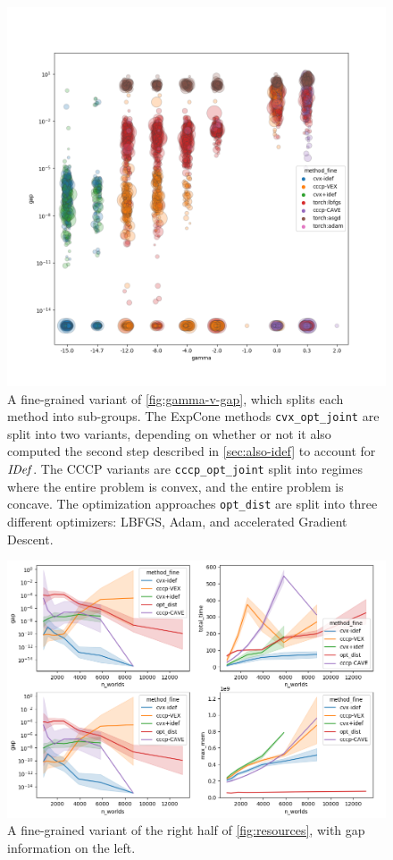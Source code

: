 \documentclass[twoside]{article}
\begin{document}
\begin{figure}
    \includegraphics[width=\linewidth]{figs/2}
    \caption{
        A fine-grained variant of \cref{fig:gamma-v-gap}, which splits each method into sub-groups.
        The ExpCone methods \texttt{cvx\_opt\_joint} are split into two variants, depending on whether or not it also computed the second step described in \cref{sec:also-idef} to account for $\mathit{IDef}_{\!}$.
        The CCCP variants are \texttt{cccp\_opt\_joint} split into regimes where the entire problem is convex, and the entire problem is concave. The optimization approaches \texttt{opt\_dist} are split into three different optimizers: LBFGS, Adam, and accelerated Gradient Descent.
    }\label{fig:gamma-v-gap-fine}
\end{figure}

\begin{figure}
    \includegraphics[width=\linewidth]{figs/1}
    \caption{
        A fine-grained variant of the right half of \cref{fig:resources}, 
        with gap information on the left. 
    }\label{fig:gap-resource-fine}
\end{figure}
\end{document}
